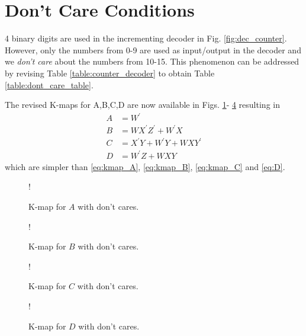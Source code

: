 \documentclass[journal,12pt,twocolumn]{IEEEtran}
\begin{document}
\section{Don't Care Conditions}
4 binary digits are used in the incrementing decoder in Fig. \ref{fig:dec_counter}.  However, only the numbers from 0-9 are used as input/output
in the decoder and we {\em don't care} about the numbers from 10-15.  This phenomenon can be addressed by revising Table \ref{table:counter_decoder} to obtain
Table \ref{table:dont_care_table}.

The revised K-maps for A,B,C,D are now available in Figs. \ref{fig:kmap_A_x}- \ref{fig:kmap_D_x} resulting in 
\begin{align}
A &= {W}^{\prime}
\\
B &= WX^{\prime}Z^{\prime} + W^{\prime}X
\\
C &= {X}^{\prime}{Y} + {W}^{\prime}{Y} + {W}{X}{Y}^{\prime}
\\
D & = {W}^{\prime}{Z} + {W}{X}{Y}
\end{align}
which are simpler than \eqref{eq:kmap_A}, \eqref{eq:kmap_B}, \eqref{eq:kmap_C} and \eqref{eq:D}. 
\begin{figure}[!h]
\resizebox {\columnwidth} {!} {

}
\caption{K-map for $A$ with don't cares.}
\label{fig:kmap_A_x}
\end{figure}
\begin{figure}[!h]
\resizebox {\columnwidth} {!} {

}
\caption{K-map for $B$ with don't cares.}
\label{fig:kmap_B_x}
\end{figure}
\begin{figure}[!h]
\resizebox {\columnwidth} {!} {

}
\caption{K-map for $C$ with don't cares.}
\label{fig:kmap_C_x}
\end{figure}
\begin{figure}[!h]
\resizebox {\columnwidth} {!} {

}
\caption{K-map for $D$ with don't cares.}
\label{fig:kmap_D_x}
\end{figure}
\end{document}
